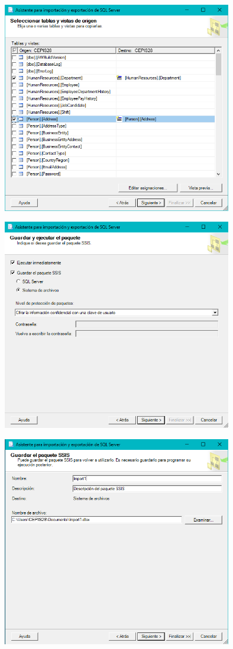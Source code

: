 	\begin{center}
	\includegraphics[width=10cm]{imagenes/img7}
    \end{center}	
    
	\begin{center}
	\includegraphics[width=10cm]{imagenes/img8}
    \end{center}	
    
	\begin{center}
	\includegraphics[width=10cm]{imagenes/img9}
    \end{center}	
    

